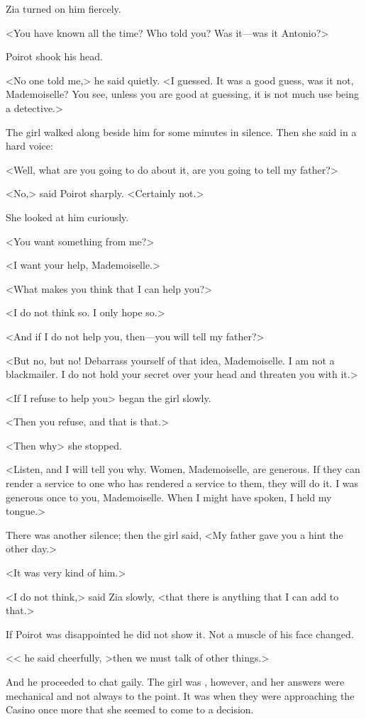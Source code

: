 Zia turned on him fiercely.

<You have known all the time? Who told you? Was it—was it Antonio?>

Poirot shook his head.

<No one told me,> he said quietly. <I guessed. It was a good guess, was it not, Mademoiselle? You see, unless you are good at guessing, it is not much use being a detective.>

The girl walked along beside him for some minutes in silence. Then she said in a hard voice:

<Well, what are you going to do about it, are you going to tell my father?>

<No,> said Poirot sharply. <Certainly not.>

She looked at him curiously.

<You want something from me?>

<I want your help, Mademoiselle.>

<What makes you think that I can help you?>

<I do not think so. I only hope so.>

<And if I do not help you, then—you will tell my father?>

<But no, but no! Debarrass yourself of that idea, Mademoiselle. I am not a blackmailer. I do not hold your secret over your head and threaten you with it.>

<If I refuse to help you\longdash> began the girl slowly.

<Then you refuse, and that is that.>

<Then why\longdash> she stopped.

<Listen, and I will tell you why. Women, Mademoiselle, are generous. If they can render a service to one who has rendered a service to them, they will do it. I was generous once to you, Mademoiselle. When I might have spoken, I held my tongue.>

There was another silence; then the girl said, <My father gave you a hint the other day.>

<It was very kind of him.>

<I do not think,> said Zia slowly, <that there is anything that I can add to that.>

If Poirot was disappointed he did not show it. Not a muscle of his face changed.

<< he said cheerfully, >then we must talk of other things.>

And he proceeded to chat gaily. The girl was , however, and her answers were mechanical and not always to the point. It was when they were approaching the Casino once more that she seemed to come to a decision.

